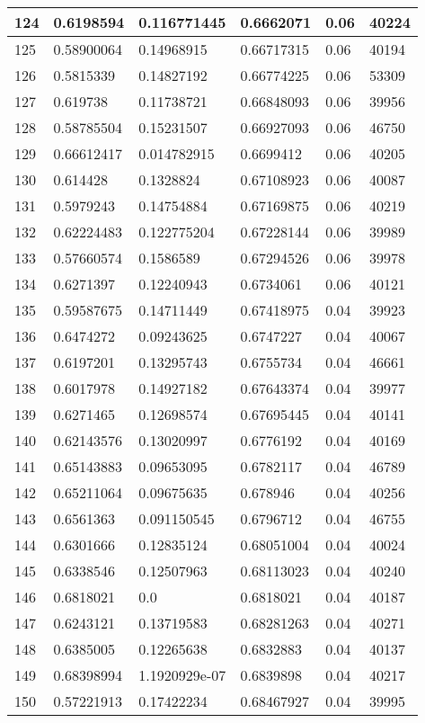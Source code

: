 \begin{longtable}{|l|l|l|l|l|l|}
124 & 0.6198594 & 0.116771445 & 0.6662071 & 0.06 & 40224 \\ \hline 
125 & 0.58900064 & 0.14968915 & 0.66717315 & 0.06 & 40194 \\ \hline 
126 & 0.5815339 & 0.14827192 & 0.66774225 & 0.06 & 53309 \\ \hline 
127 & 0.619738 & 0.11738721 & 0.66848093 & 0.06 & 39956 \\ \hline 
128 & 0.58785504 & 0.15231507 & 0.66927093 & 0.06 & 46750 \\ \hline 
129 & 0.66612417 & 0.014782915 & 0.6699412 & 0.06 & 40205 \\ \hline 
130 & 0.614428 & 0.1328824 & 0.67108923 & 0.06 & 40087 \\ \hline 
131 & 0.5979243 & 0.14754884 & 0.67169875 & 0.06 & 40219 \\ \hline 
132 & 0.62224483 & 0.122775204 & 0.67228144 & 0.06 & 39989 \\ \hline 
133 & 0.57660574 & 0.1586589 & 0.67294526 & 0.06 & 39978 \\ \hline 
134 & 0.6271397 & 0.12240943 & 0.6734061 & 0.06 & 40121 \\ \hline 
135 & 0.59587675 & 0.14711449 & 0.67418975 & 0.04 & 39923 \\ \hline 
136 & 0.6474272 & 0.09243625 & 0.6747227 & 0.04 & 40067 \\ \hline 
137 & 0.6197201 & 0.13295743 & 0.6755734 & 0.04 & 46661 \\ \hline 
138 & 0.6017978 & 0.14927182 & 0.67643374 & 0.04 & 39977 \\ \hline 
139 & 0.6271465 & 0.12698574 & 0.67695445 & 0.04 & 40141 \\ \hline 
140 & 0.62143576 & 0.13020997 & 0.6776192 & 0.04 & 40169 \\ \hline 
141 & 0.65143883 & 0.09653095 & 0.6782117 & 0.04 & 46789 \\ \hline 
142 & 0.65211064 & 0.09675635 & 0.678946 & 0.04 & 40256 \\ \hline 
143 & 0.6561363 & 0.091150545 & 0.6796712 & 0.04 & 46755 \\ \hline 
144 & 0.6301666 & 0.12835124 & 0.68051004 & 0.04 & 40024 \\ \hline 
145 & 0.6338546 & 0.12507963 & 0.68113023 & 0.04 & 40240 \\ \hline 
146 & 0.6818021 & 0.0 & 0.6818021 & 0.04 & 40187 \\ \hline 
147 & 0.6243121 & 0.13719583 & 0.68281263 & 0.04 & 40271 \\ \hline 
148 & 0.6385005 & 0.12265638 & 0.6832883 & 0.04 & 40137 \\ \hline 
149 & 0.68398994 & 1.1920929e-07 & 0.6839898 & 0.04 & 40217 \\ \hline 
150 & 0.57221913 & 0.17422234 & 0.68467927 & 0.04 & 39995 \\ \hline 
\end{longtable}